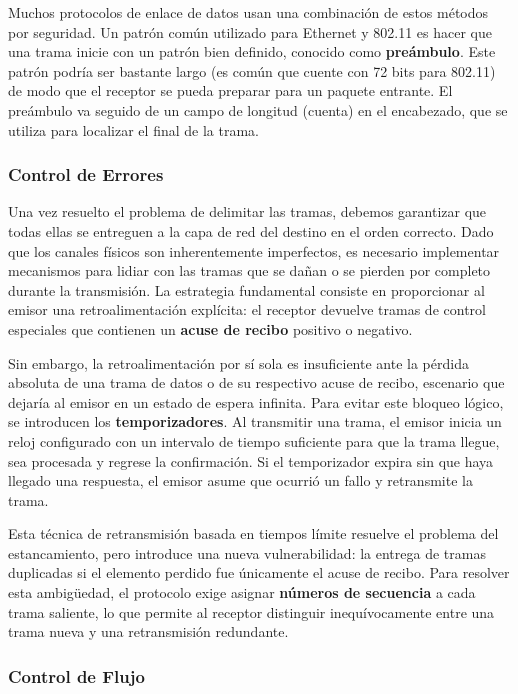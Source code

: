 Muchos protocolos de enlace de datos usan una combinación de estos métodos por seguridad. Un patrón común utilizado para Ethernet y 802.11 es hacer que una trama inicie con un patrón bien definido, conocido como \textbf{preámbulo}. Este patrón podría ser bastante largo (es común que cuente con 72 bits para 802.11) de modo que el receptor se pueda preparar para un paquete entrante. El preámbulo va seguido de un campo de longitud (cuenta) en el encabezado, que se utiliza para localizar el final de la trama.

\subsubsection{Control de Errores}

Una vez resuelto el problema de delimitar las tramas, debemos garantizar que todas ellas se entreguen a la capa de red del destino en el orden correcto. Dado que los canales físicos son inherentemente imperfectos, es necesario implementar mecanismos para lidiar con las tramas que se dañan o se pierden por completo durante la transmisión. La estrategia fundamental consiste en proporcionar al emisor una retroalimentación explícita: el receptor devuelve tramas de control especiales que contienen un \textbf{acuse de recibo} positivo o negativo.

Sin embargo, la retroalimentación por sí sola es insuficiente ante la pérdida absoluta de una trama de datos o de su respectivo acuse de recibo, escenario que dejaría al emisor en un estado de espera infinita. Para evitar este bloqueo lógico, se introducen los \textbf{temporizadores}. Al transmitir una trama, el emisor inicia un reloj configurado con un intervalo de tiempo suficiente para que la trama llegue, sea procesada y regrese la confirmación. Si el temporizador expira sin que haya llegado una respuesta, el emisor asume que ocurrió un fallo y retransmite la trama. 

Esta técnica de retransmisión basada en tiempos límite resuelve el problema del estancamiento, pero introduce una nueva vulnerabilidad: la entrega de tramas duplicadas si el elemento perdido fue únicamente el acuse de recibo. Para resolver esta ambigüedad, el protocolo exige asignar \textbf{números de secuencia} a cada trama saliente, lo que permite al receptor distinguir inequívocamente entre una trama nueva y una retransmisión redundante.

\subsubsection{Control de Flujo}

